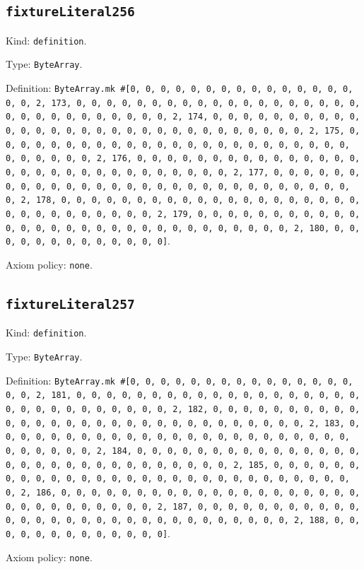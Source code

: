 \documentclass[11pt]{article}
\begin{document}
\subsection*{\texttt{fixtureLiteral256}}
\noindent Kind: \texttt{definition}.\par
\noindent Type: \texttt{ByteArray}.\par
\noindent Definition: \texttt{ByteArray.mk \#[0, 0, 0, 0, 0, 0, 0, 0, 0, 0, 0, 0, 0, 0, 0, 0, 0, 2, 173, 0, 0, 0, 0, 0, 0, 0, 0, 0, 0, 0, 0, 0, 0, 0, 0, 0, 0, 0, 0, 0, 0, 0, 0, 0, 0, 0, 0, 0, 0, 2, 174, 0, 0, 0, 0, 0, 0, 0, 0, 0, 0, 0, 0, 0, 0, 0, 0, 0, 0, 0, 0, 0, 0, 0, 0, 0, 0, 0, 0, 0, 0, 2, 175, 0, 0, 0, 0, 0, 0, 0, 0, 0, 0, 0, 0, 0, 0, 0, 0, 0, 0, 0, 0, 0, 0, 0, 0, 0, 0, 0, 0, 0, 0, 2, 176, 0, 0, 0, 0, 0, 0, 0, 0, 0, 0, 0, 0, 0, 0, 0, 0, 0, 0, 0, 0, 0, 0, 0, 0, 0, 0, 0, 0, 0, 0, 2, 177, 0, 0, 0, 0, 0, 0, 0, 0, 0, 0, 0, 0, 0, 0, 0, 0, 0, 0, 0, 0, 0, 0, 0, 0, 0, 0, 0, 0, 0, 0, 2, 178, 0, 0, 0, 0, 0, 0, 0, 0, 0, 0, 0, 0, 0, 0, 0, 0, 0, 0, 0, 0, 0, 0, 0, 0, 0, 0, 0, 0, 0, 0, 2, 179, 0, 0, 0, 0, 0, 0, 0, 0, 0, 0, 0, 0, 0, 0, 0, 0, 0, 0, 0, 0, 0, 0, 0, 0, 0, 0, 0, 0, 0, 0, 2, 180, 0, 0, 0, 0, 0, 0, 0, 0, 0, 0, 0, 0, 0]}.\par
\noindent Axiom policy: \texttt{none}.\par
\subsection*{\texttt{fixtureLiteral257}}
\noindent Kind: \texttt{definition}.\par
\noindent Type: \texttt{ByteArray}.\par
\noindent Definition: \texttt{ByteArray.mk \#[0, 0, 0, 0, 0, 0, 0, 0, 0, 0, 0, 0, 0, 0, 0, 0, 0, 2, 181, 0, 0, 0, 0, 0, 0, 0, 0, 0, 0, 0, 0, 0, 0, 0, 0, 0, 0, 0, 0, 0, 0, 0, 0, 0, 0, 0, 0, 0, 0, 2, 182, 0, 0, 0, 0, 0, 0, 0, 0, 0, 0, 0, 0, 0, 0, 0, 0, 0, 0, 0, 0, 0, 0, 0, 0, 0, 0, 0, 0, 0, 0, 2, 183, 0, 0, 0, 0, 0, 0, 0, 0, 0, 0, 0, 0, 0, 0, 0, 0, 0, 0, 0, 0, 0, 0, 0, 0, 0, 0, 0, 0, 0, 0, 2, 184, 0, 0, 0, 0, 0, 0, 0, 0, 0, 0, 0, 0, 0, 0, 0, 0, 0, 0, 0, 0, 0, 0, 0, 0, 0, 0, 0, 0, 0, 0, 2, 185, 0, 0, 0, 0, 0, 0, 0, 0, 0, 0, 0, 0, 0, 0, 0, 0, 0, 0, 0, 0, 0, 0, 0, 0, 0, 0, 0, 0, 0, 0, 2, 186, 0, 0, 0, 0, 0, 0, 0, 0, 0, 0, 0, 0, 0, 0, 0, 0, 0, 0, 0, 0, 0, 0, 0, 0, 0, 0, 0, 0, 0, 0, 2, 187, 0, 0, 0, 0, 0, 0, 0, 0, 0, 0, 0, 0, 0, 0, 0, 0, 0, 0, 0, 0, 0, 0, 0, 0, 0, 0, 0, 0, 0, 0, 2, 188, 0, 0, 0, 0, 0, 0, 0, 0, 0, 0, 0, 0, 0]}.\par
\noindent Axiom policy: \texttt{none}.\par
\end{document}
